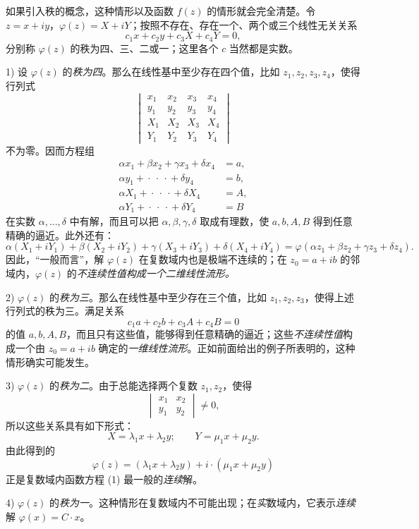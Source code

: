 \documentclass[11pt]{article}
\providecommand{\qtext}[1]{“#1”}
\begin{document}
如果引入秩的概念，这种情形以及函数 \(f(z)\) 的情形就会完全清楚。令 \(z=x+iy\)，\(\varphi(z)=X+iY\)；按照不存在、存在一个、两个或三个线性无关关系
\[
c_1x+c_2y+c_3X+c_4Y=0,
\]
分别称 \(\varphi(z)\) 的秩为四、三、二或一；这里各个 \(c\) 当然都是实数。

1) 设 \(\varphi(z)\) 的\emph{秩为四}。那么在线性基中至少存在四个值，比如 \(z_1,z_2,z_3,z_4\)，使得行列式
\[
\begin{vmatrix}
x_1&x_2&x_3&x_4\\
y_1&y_2&y_3&y_4\\
X_1&X_2&X_3&X_4\\
Y_1&Y_2&Y_3&Y_4
\end{vmatrix}
\]
不为零。因而方程组
\[
\begin{aligned}
\alpha x_1+\beta x_2+\gamma x_3+\delta x_4&=a,\\
\alpha y_1+{}\cdot{}\ \cdot{}\ \cdot{}+\delta y_4&=b,\\
\alpha X_1+{}\cdot{}\ \cdot{}\ \cdot{}+\delta X_4&=A,\\
\alpha Y_1+{}\cdot{}\ \cdot{}\ \cdot{}+\delta Y_4&=B
\end{aligned}
\]
在实数 \(\alpha,\ldots,\delta\) 中有解，而且可以把 \(\alpha,\beta,\gamma,\delta\) 取成有理数，使 \(a,b,A,B\) 得到任意精确的逼近。此外还有：
\[
\alpha(X_1+iY_1)+\beta(X_2+iY_2)+\gamma(X_3+iY_3)+\delta(X_4+iY_4)
 =\varphi(\alpha z_1+\beta z_2+\gamma z_3+\delta z_4).
\]
因此，\qtext{一般而言}，解 \(\varphi(z)\) 在复数域内也是极端不连续的；在 \(z_0=a+ib\) 的邻域内，\(\varphi(z)\) 的\emph{不连续性值}\emph{构成一个二维线性流形。}

2) \(\varphi(z)\) 的\emph{秩为三}。那么在线性基中至少存在三个值，比如 \(z_1,z_2,z_3\)，使得上述行列式的秩为三。满足关系
\[
c_1a+c_2b+c_3A+c_4B=0
\]
的值 \(a,b,A,B\)，而且只有这些值，能够得到任意精确的逼近；这些\emph{不连续性值}构成一个由 \(z_0=a+ib\) 确定的\emph{一维线性流形}。正如前面给出的例子所表明的，这种情形确实可能发生。

3) \(\varphi(z)\) 的\emph{秩为二}。由于总能选择两个复数 \(z_1,z_2\)，使得
\[
\begin{vmatrix}x_1&x_2\\ y_1&y_2\end{vmatrix}\ne0,
\]
所以这些关系具有如下形式：
\[
X=\lambda_1x+\lambda_2y;\qquad Y=\mu_1x+\mu_2y.
\]
由此得到的
\[
\varphi(z)=(\lambda_1x+\lambda_2y)+i\cdot(\mu_1x+\mu_2y)
\]
正是复数域内函数方程 (1) 最一般的\emph{连续}解。

4) \(\varphi(z)\) 的\emph{秩为一}。这种情形在复数域内不可能出现；在\emph{实}数域内，它表示\emph{连续}解 \(\varphi(x)=C\cdot x\)。
\end{document}
